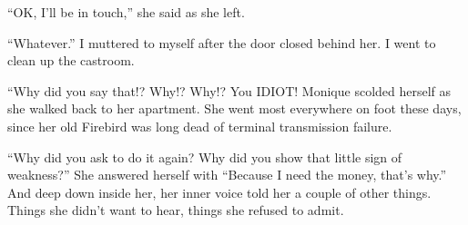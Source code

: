     ``OK, I'll be in touch,'' she said as she left.

    ``Whatever.'' I muttered to myself after the door closed behind her. I went to clean up the
castroom.

\begin{thought}
    ``Why did you say that!? Why!? Why!? You IDIOT! Monique scolded herself as she walked back
to her apartment. She went most everywhere on foot these days, since her old Firebird was long
dead of terminal transmission failure.

    ``Why did you ask to do it again? Why did you show that little sign of weakness?'' She
answered herself with ``Because I need the money, that's why.'' And deep down inside her, her
inner voice told her a couple of other things. Things she didn't want to hear, things she
refused to admit.
\end{thought}

